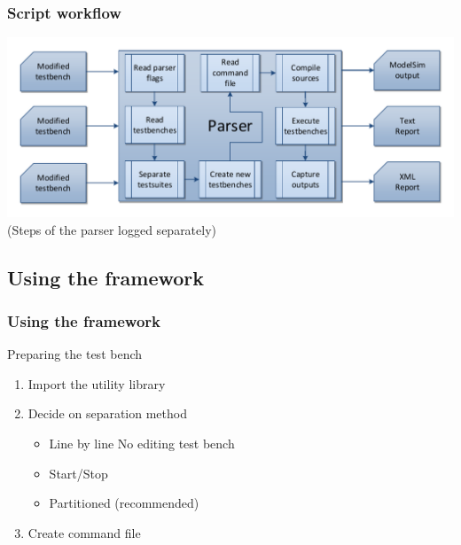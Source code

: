 \documentclass[british,10pt]{beamer}
\begin{document}
\begin{frame}\frametitle{Script workflow}
\includegraphics[width=\textwidth]{images/parserwork.pdf}
\newline{}
\centering(Steps of the parser logged separately)
\end{frame}


\subsection{Using the framework}

\begin{frame}\frametitle{Using the framework}
Preparing the test bench
\begin{enumerate}
\item Import the utility library
\item Decide on separation method
\begin{itemize}
\item Line by line  No editing test bench
\item Start/Stop
\item Partitioned (recommended)
\end{itemize}
\item Create command file
\end{enumerate}
\end{frame}
\end{document}
